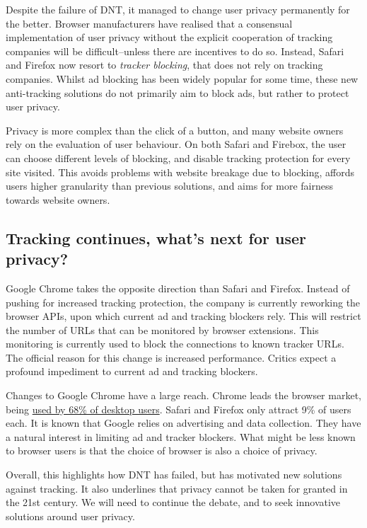 \documentclass[
]{book}
\begin{document}
Despite the failure of DNT, it managed to change user privacy permanently for the better. Browser manufacturers have realised that a consensual implementation of user privacy without the explicit cooperation of tracking companies will be difficult--unless there are incentives to do so. Instead, Safari and Firefox now resort to \emph{tracker blocking}, that does not rely on tracking companies. Whilst ad blocking has been widely popular for some time, these new anti-tracking solutions do not primarily aim to block ads, but rather to protect user privacy.

Privacy is more complex than the click of a button, and many website owners rely on the evaluation of user behaviour. On both Safari and Firebox, the user can choose different levels of blocking, and disable tracking protection for every site visited. This avoids problems with website breakage due to blocking, affords users higher granularity than previous solutions, and aims for more fairness towards website owners.

\hypertarget{tracking-continues-whats-next-for-user-privacy}{%
\subsection{Tracking continues, what's next for user privacy?}\label{tracking-continues-whats-next-for-user-privacy}}

Google Chrome takes the opposite direction than Safari and Firefox. Instead of pushing for increased tracking protection, the company is currently reworking the browser APIs, upon which current ad and tracking blockers rely. This will restrict the number of URLs that can be monitored by browser extensions. This monitoring is currently used to block the connections to known tracker URLs. The official reason for this change is increased performance. Critics expect a profound impediment to current ad and tracking blockers.

Changes to Google Chrome have a large reach. Chrome leads the browser market, being \href{https://gs.statcounter.com/browser-market-share/desktop/worldwide}{used by 68\% of desktop users}. Safari and Firefox only attract 9\% of users each. It is known that Google relies on advertising and data collection. They have a natural interest in limiting ad and tracker blockers. What might be less known to browser users is that the choice of browser is also a choice of privacy.

Overall, this highlights how DNT has failed, but has motivated new solutions against tracking. It also underlines that privacy cannot be taken for granted in the 21st century. We will need to continue the debate, and to seek innovative solutions around user privacy.
\end{document}
